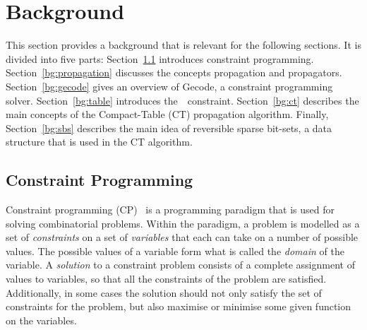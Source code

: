 \documentclass[a4paper,11pt]{article}
\theoremstyle{definition}
\newcommand{\Secref}[1]{Section~\ref{#1}}
\newcommand{\Table}{\Constraint{Table}}
\numberwithin{equation}{section}
\begin{document}
\section{Background}
\label{bg}


This section provides a background that is relevant for the
following sections. It is divided into five parts: \Secref{bg:cp}
introduces constraint programming. \Secref{bg:propagation} discusses
the concepts propagation and propagators.
\Secref{bg:gecode} gives an overview
of Gecode, a constraint programming solver.
\Secref{bg:table} introduces the~\Table~constraint.
\Secref{bg:ct} describes the main concepts of the
Compact-Table (CT) propagation algorithm.
Finally, \Secref{bg:sbs}
describes the main idea of reversible sparse bit-sets,
a data structure that is used in the CT algorithm.

\subsection{Constraint Programming}
\label{bg:cp}
Constraint programming (CP)~\cite{Apt:constraintsBook}
is a programming paradigm that is used for solving
combinatorial problems. Within the paradigm, a problem is
modelled as a set of \emph{constraints} on a
set of \emph{variables} that each can take on a number of
possible values. The possible values of
a variable form what is called the \emph{domain} of the variable.
A \emph{solution} to a constraint problem consists of a complete assignment
of values to variables, so that all the constraints of the problem
are satisfied. Additionally, in some cases the solution should not only
satisfy the set of constraints for the
problem, but also maximise or minimise some given function on the variables.
\end{document}
